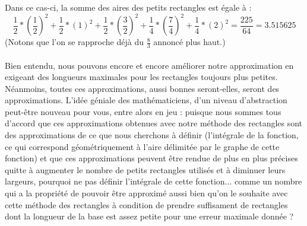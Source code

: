 \documentclass[a4paper,fontsize=13pt]{scrreprt}
\theoremstyle{plain}
\theoremstyle{definition}
\newcommand {\grille}{\draw[help lines] (\xmin,\ymin) grid (\xmax,\ymax);}
\newcommand {\axes} {
	\draw[thick, ->] (\xmin,0) -- (\xmax+1,0);
	\draw[thick, ->] (0,\ymin) -- (0,\ymax+1);
	\draw (0,\ymax+0.5) node [left] {$y$};
	\draw (\xmax+0.5, 0) node [below] {$x$};
	\draw[thick] (-0.15,1)--(0.15,1) (1,-0.15)--(1,0.15);
	\draw (0,1)node[left]{$1$} (1,0)node[below]{$1$};
}
\begin{document}
\begin{center}
\end{center}
Dans ce cas-ci, la somme des aires des petits rectangles est égale à :
$$\frac{1}{2}*(\frac{1}{2})^2 + \frac{1}{2}*(1)^2 + \frac{1}{2}*(\frac{3}{2})^2 + \frac{1}{4} * (\frac{7}{4})^2 + \frac{1}{4}*(2)^2 = \frac{225}{64} = 3.515625$$
(Notons que l'on se rapproche déjà du $\frac{8}{3}$ annoncé plus haut.) \\
~\\
Bien entendu, nous pouvons encore et encore améliorer notre approximation en exigeant des longueurs maximales pour les rectangles toujours plus petites. Néanmoins, toutes ces approximations, aussi bonnes seront-elles, seront des approximations. \newpage
L'idée géniale des mathématiciens, d'un niveau d'abstraction peut-être nouveau pour vous, entre alors en jeu : puisque nous sommes tous d'accord que ces approximations obtenues avec notre méthode des rectangles sont des approximations de ce que nous cherchons à définir (l'intégrale de la fonction, ce qui correspond géométriquement à l'aire délimitée par le graphe de cette fonction) et que ces approximations peuvent être rendue de plus en plus précises quitte à augmenter le nombre de petits rectangles utilisés et à diminuer leurs largeurs, pourquoi ne pas définir l'intégrale de cette fonction... comme un nombre qui a la propriété de pouvoir être approximé aussi bien qu'on le souhaite avec cette méthode des rectangles à condition de prendre suffisament de rectangles dont la longueur de la base est assez petite pour une erreur maximale donnée ? \\
\end{document}
